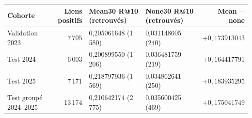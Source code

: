 \begin{tabularx}{\linewidth}{@{}XrXXr@{}}
\toprule
Cohorte & Liens positifs & Mean30 R@10 (retrouvés) & None30 R@10 (retrouvés) & Mean $-$ none\\
\midrule
Validation 2023 & 7\,705 & 0,205061648 (1\,580) & 0,031148605 (240) & $+0,173913043$\\
Test 2024 & 6\,003 & 0,200899550 (1\,206) & 0,036481759 (219) & $+0,164417791$\\
Test 2025 & 7\,171 & 0,218797936 (1\,569) & 0,034862641 (250) & $+0,183935295$\\
Test groupé 2024--2025 & 13\,174 & 0,210642174 (2\,775) & 0,035600425 (469) & $+0,175041749$\\
\bottomrule
\end{tabularx}